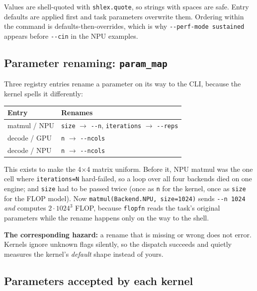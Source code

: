 \documentclass[11pt,a4paper]{article}
\newcommand{\code}[1]{\texttt{\let\_\breakableunderscore #1}}
\newcommand{\breakableunderscore}{\textunderscore\allowbreak}
\newcommand{\arrow}{$\rightarrow$}
\begin{document}
\noindent Values are shell-quoted with \code{shlex.quote}, so strings with
spaces are safe. Entry defaults are applied first and task parameters overwrite
them. Ordering within the command is defaults-then-overrides, which is why
\code{-{}-perf-mode sustained} appears before \code{-{}-cin} in the NPU
examples.

\subsection{Parameter renaming: \texttt{param\_map}}
\label{sec:parammap}

Three registry entries rename a parameter on its way to the CLI, because the
kernel spells it differently:

\begin{longtable}{@{}p{3.2cm}p{11.5cm}@{}}
\toprule
\textbf{Entry} & \textbf{Renames} \\
\midrule
\endhead
matmul / NPU & \code{size} \arrow{} \code{-{}-n}, \code{iterations} \arrow{}
  \code{-{}-reps} \\
decode / GPU & \code{n} \arrow{} \code{-{}-ncols} \\
decode / NPU & \code{n} \arrow{} \code{-{}-ncols} \\
\bottomrule
\end{longtable}

\noindent This exists to make the 4$\times$4 matrix uniform. Before it, NPU
matmul was the one cell where \code{iterations=N} hard-failed, so a loop over
all four backends died on one engine; and \code{size} had to be passed twice
(once as \code{n} for the kernel, once as \code{size} for the FLOP model).
Now \code{matmul(Backend.NPU, size=1024)} sends \code{-{}-n 1024} \emph{and}
computes $2 \cdot 1024^3$ FLOP, because \code{flop\_fn} reads the task's
original parameters while the rename happens only on the way to the shell.

\textbf{The corresponding hazard:} a rename that is missing or wrong does not
error. Kernels ignore unknown flags silently, so the dispatch succeeds and
quietly measures the kernel's \emph{default} shape instead of yours.

\subsection{Parameters accepted by each kernel}
\end{document}
